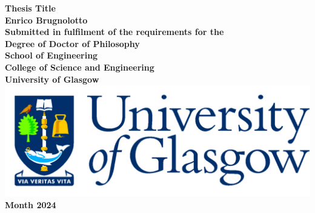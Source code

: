 \documentclass[12pt,titlepage,oneside]{book} %
\begin{document}
\begin{titlepage}
\centering
\vspace*{3cm}  %
\bfseries\Large
Thesis Title\\
\vspace{3cm}
\normalfont\large
Enrico Brugnolotto\\
\vspace{2cm}
Submitted in fulfilment of the requirements for the\\
Degree of Doctor of Philosophy\\
\vspace{2cm}
School of Engineering\\
College of Science and Engineering\\
University of Glasgow\\
\vspace{1cm}
\includegraphics[scale=0.125]{GlaLogo.pdf}
\\
\vspace{1cm}
Month 2024
\end{titlepage}
\frontmatter  %
%
\tableofcontents
\listoftables
\listoffigures
\printglossaries



\mainmatter %








\appendix



\backmatter  %

\printbibliography
\end{document}
